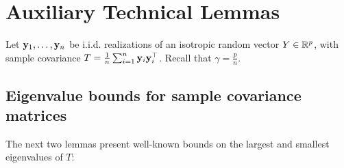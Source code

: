 \documentclass[times,sort&compress,3p]{elsarticle}
\begin{document}


\section{Auxiliary Technical Lemmas}

Let ${\bf y}_1,\ldots,{\bf y}_n$ be i.i.d. realizations of an isotropic random vector $Y\in \mathbb{R}^p$, with sample covariance $T=\frac1n \sum_{i=1}^n {\bf y}_i{\bf y}_i^\top$. Recall that $\gamma=\frac{p}{n}$. 

\subsection{Eigenvalue bounds for sample covariance matrices}

The next two lemmas present well-known bounds on the largest and smallest eigenvalues of $T$:
\end{document}
